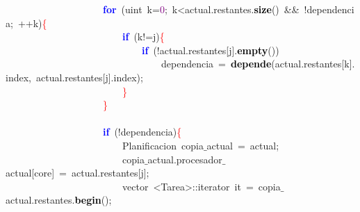 \mbox{}\ \ \ \ \ \ \ \ \ \ \ \ \ \ \ \ \ \ \ \ \textbf{\textcolor{Blue}{for}}\ \textcolor{BrickRed}{(}\textcolor{TealBlue}{uint}\ k\textcolor{BrickRed}{=}\textcolor{Purple}{0}\textcolor{BrickRed}{;}\ k\textcolor{BrickRed}{\textless{}}actual\textcolor{BrickRed}{.}restantes\textcolor{BrickRed}{.}\textbf{\textcolor{Black}{size}}\textcolor{BrickRed}{()}\ \textcolor{BrickRed}{\&\&}\ \textcolor{BrickRed}{!}dependencia\textcolor{BrickRed}{;}\ \textcolor{BrickRed}{++}k\textcolor{BrickRed}{)}\textcolor{Red}{\{} \\
\mbox{}\ \ \ \ \ \ \ \ \ \ \ \ \ \ \ \ \ \ \ \ \ \ \ \ \textbf{\textcolor{Blue}{if}}\ \textcolor{BrickRed}{(}k\textcolor{BrickRed}{!=}j\textcolor{BrickRed}{)}\textcolor{Red}{\{} \\
\mbox{}\ \ \ \ \ \ \ \ \ \ \ \ \ \ \ \ \ \ \ \ \ \ \ \ \ \ \ \ \textbf{\textcolor{Blue}{if}}\ \textcolor{BrickRed}{(!}actual\textcolor{BrickRed}{.}restantes\textcolor{BrickRed}{[}j\textcolor{BrickRed}{].}\textbf{\textcolor{Black}{empty}}\textcolor{BrickRed}{())} \\
\mbox{}\ \ \ \ \ \ \ \ \ \ \ \ \ \ \ \ \ \ \ \ \ \ \ \ \ \ \ \ \ \ \ \ dependencia\ \textcolor{BrickRed}{=}\ \textbf{\textcolor{Black}{depende}}\textcolor{BrickRed}{(}actual\textcolor{BrickRed}{.}restantes\textcolor{BrickRed}{[}k\textcolor{BrickRed}{].}index\textcolor{BrickRed}{,}\ actual\textcolor{BrickRed}{.}restantes\textcolor{BrickRed}{[}j\textcolor{BrickRed}{].}index\textcolor{BrickRed}{);} \\
\mbox{}\ \ \ \ \ \ \ \ \ \ \ \ \ \ \ \ \ \ \ \ \ \ \ \ \textcolor{Red}{\}} \\
\mbox{}\ \ \ \ \ \ \ \ \ \ \ \ \ \ \ \ \ \ \ \ \textcolor{Red}{\}} \\
\mbox{} \\
\mbox{}\ \ \ \ \ \ \ \ \ \ \ \ \ \ \ \ \ \ \ \ \textbf{\textcolor{Blue}{if}}\ \textcolor{BrickRed}{(!}dependencia\textcolor{BrickRed}{)}\textcolor{Red}{\{} \\
\mbox{}\ \ \ \ \ \ \ \ \ \ \ \ \ \ \ \ \ \ \ \ \ \ \ \ \textcolor{TealBlue}{Planificacion}\ copia$\_$actual\ \textcolor{BrickRed}{=}\ actual\textcolor{BrickRed}{;} \\
\mbox{}\ \ \ \ \ \ \ \ \ \ \ \ \ \ \ \ \ \ \ \ \ \ \ \ copia$\_$actual\textcolor{BrickRed}{.}procesador$\_$actual\textcolor{BrickRed}{[}core\textcolor{BrickRed}{]}\ \textcolor{BrickRed}{=}\ actual\textcolor{BrickRed}{.}restantes\textcolor{BrickRed}{[}j\textcolor{BrickRed}{];} \\
\mbox{}\ \ \ \ \ \ \ \ \ \ \ \ \ \ \ \ \ \ \ \ \ \ \ \ vector\ \textcolor{BrickRed}{\textless{}}Tarea\textcolor{BrickRed}{\textgreater{}::}\textcolor{TealBlue}{iterator}\ it\ \textcolor{BrickRed}{=}\ copia$\_$actual\textcolor{BrickRed}{.}restantes\textcolor{BrickRed}{.}\textbf{\textcolor{Black}{begin}}\textcolor{BrickRed}{();} \\
